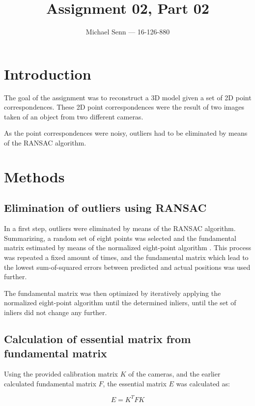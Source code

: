 \documentclass[a4paper]{scrreprt}
\title{Assignment 02, Part 02}
\author{Michael Senn \maillink{michael.senn@students.unibe.ch} --- 16-126-880}
\date{\printdate}
\begin{document}
\maketitle

\chapter{Introduction}

The goal of the assignment was to reconstruct a 3D model given a set of 2D
point correspondences. These 2D point correspondences were the result of two
images taken of an object from two different cameras.

As the point correspondences were noisy, outliers had to be eliminated by means
of the RANSAC algorithm. \autocite{fischlerRandomSampleConsensus1981}

\chapter{Methods}

\section{Elimination of outliers using RANSAC}

In a first step, outliers were eliminated by means of the RANSAC algorithm.
\autocite{fischlerRandomSampleConsensus1981} Summarizing, a random set of eight
points was selected and the fundamental matrix estimated by means of the
normalized eight-point algorithm
\autocite{hartleyDefenseEightpointAlgorithm1997}. This process was repeated a
fixed amount of times, and the fundamental matrix which lead to the lowest
sum-of-squared errors between predicted and actual positions was used further.

The fundamental matrix was then optimized by iteratively applying the
normalized eight-point algorithm until the determined inliers, until the set of
inliers did not change any further.

\section{Calculation of essential matrix from fundamental matrix}

Using the provided calibration matrix $K$ of the cameras, and the earlier
calculated fundamental matrix $F$, the essential matrix $E$ was calculated as:

\[
		E = K^T F K
\]
\end{document}

